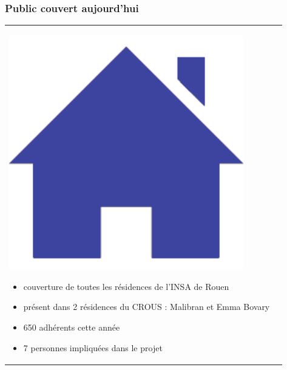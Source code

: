 \documentclass[handout]{beamer}
\begin{document}
		\begin{frame}
		\frametitle{Public couvert aujourd'hui}
		\begin{tabular}{l l}
			\begin{minipage}{0.2\textwidth}
				\begin{center}
					\includegraphics[width=0.9\textwidth]{images/residence.png}
				\end{center}
			\end{minipage}

			\begin{minipage}{0.8\textwidth}
				\begin{itemize}
					\item couverture de toutes les résidences de l'INSA de Rouen
					\item présent dans 2 résidences du CROUS : Malibran et Emma Bovary
					\item 650 adhérents cette année
					\item 7 personnes impliquées dans le projet
				\end{itemize}
			\end{minipage}
			
		\end{tabular}
		\end{frame}
\end{document}
